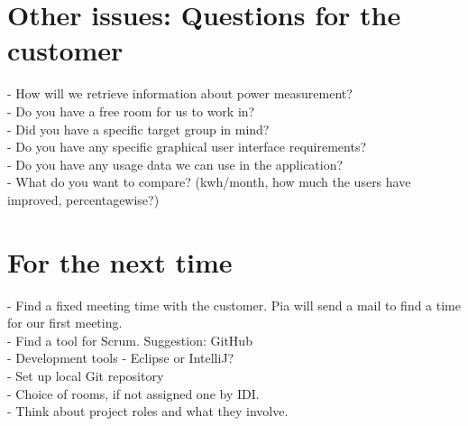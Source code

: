 \documentclass[12pt]{article}
\begin{document}
\section{Other issues: Questions for the customer}
- How will we retrieve information about power measurement?\\
- Do you have a free room for us to work in?\\
- Did you have a specific target group in mind?\\
- Do you have any specific graphical user interface requirements?\\
- Do you have any usage data we can use in the application?\\
- What do you want to compare? (kwh/month, how much the users have improved, percentagewise?)


\section{For the next time}
- Find a fixed meeting time with the customer. Pia will send a mail to find a time for our first meeting.\\
- Find a tool for Scrum. Suggestion: GitHub\\
- Development tools - Eclipse or IntelliJ?\\
- Set up local Git repository\\
- Choice of rooms, if not assigned one by IDI.\\
- Think about project roles and what they involve.\\
\end{document}
